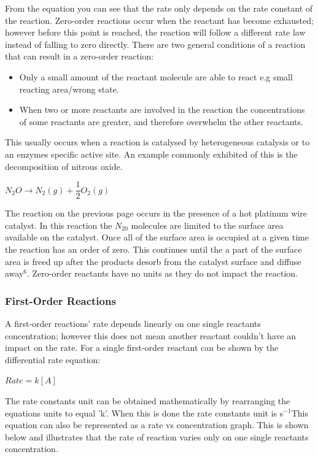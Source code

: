 From the equation you can see that the rate only depends on the rate constant of the reaction. Zero-order reactions occur when the reactant has become exhausted; however before this point is reached, the reaction will follow a different rate law instead of falling to zero directly. There are two general conditions of a reaction that can result in a zero-order reaction:

\begin{itemize}
\item Only a small amount of the reactant molecule are able to react e.g small reacting area/wrong state.
\item When two or more reactants are involved in the reaction the concentrations of some reactants are greater, and therefore overwhelm the other reactants.
\end{itemize}

This usually occurs when a reaction is catalysed by heterogeneous catalysis or to an enzymes specific active site. An example commonly exhibited of this is the decomposition of nitrous oxide.

$N_2O \rightarrow N_2(g) + \dfrac{1}{2} O_2(g)$

The reaction on the previous page occurs in the presence of a hot platinum wire catalyst. In this reaction the $N_20$ molecules are limited to the surface area available on the catalyst. Once all of the surface area is occupied at a given time the reaction has an order of zero. This continues until the a part of the surface area is freed up after the products desorb from the catalyst surface and diffuse away$^6$. Zero-order reactants have no units as they do not impact the reaction.



\subsubsection{First-Order Reactions}

A first-order reactions' rate depends linearly on one single reactants concentration; however this does not mean another reactant couldn't have an impact on the rate. For a single first-order reactant can be shown by the differential rate equation:

$Rate = k[A]$

The rate constants unit can be obtained mathematically by rearranging the equations units to equal 'k'. When this is done the rate constants unit is s$^{-1}$This equation can also be represented as a rate vs concentration graph. This is shown below and illustrates that the rate of reaction varies only on one single reactants concentration.


